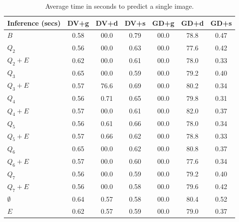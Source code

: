 \begin{table}[h]
  \centering
  \begin{tabular}{l|c|c|c|c|c|c}
    \hline
    \multicolumn{1}{c}{\bfseries Inference (secs)} & \multicolumn{1}{c}{\bfseries DV+g} &
    \multicolumn{1}{c}{\bfseries DV+d} & \multicolumn{1}{c}{\bfseries DV+s} &
    \multicolumn{1}{c}{\bfseries GD+g} & \multicolumn{1}{c}{\bfseries GD+d} &
    \multicolumn{1}{c}{\bfseries GD+s}\\
    \hline
    $B$         & 0.58 & 00.0 & 0.79 & 00.0 & 78.8 & 0.47 \\
    $Q_2$       & 0.56 & 00.0 & 0.63 & 00.0 & 77.6 & 0.42 \\
    $Q_2+E$     & 0.62 & 00.0 & 0.61 & 00.0 & 78.0 & 0.33 \\
    $Q_3$       & 0.65 & 00.0 & 0.59 & 00.0 & 79.2 & 0.40 \\
    $Q_3+E$     & 0.57 & 76.6 & 0.69 & 00.0 & 80.2 & 0.34 \\
    $Q_4$       & 0.56 & 0.71 & 0.65 & 00.0 & 79.8 & 0.31 \\
    $Q_4+E$     & 0.57 & 00.0 & 0.61 & 00.0 & 82.0 & 0.37 \\
    $Q_5$       & 0.56 & 0.61 & 0.66 & 00.0 & 78.0 & 0.34 \\
    $Q_5+E$     & 0.57 & 0.66 & 0.62 & 00.0 & 78.8 & 0.33 \\
    $Q_6$       & 0.65 & 00.0 & 0.62 & 00.0 & 80.8 & 0.37 \\
    $Q_6+E$     & 0.57 & 00.0 & 0.60 & 00.0 & 77.6 & 0.34 \\
    $Q_7$       & 0.56 & 00.0 & 0.59 & 00.0 & 79.2 & 0.40 \\
    $Q_7+E$     & 0.56 & 00.0 & 0.58 & 00.0 & 79.6 & 0.42 \\
    $\emptyset$ & 0.64 & 0.57 & 0.58 & 00.0 & 80.4 & 0.52 \\
    $E$         & 0.62 & 0.57 & 0.59 & 00.0 & 79.0 & 0.37 \\
  \end{tabular}
  \caption{Average time in seconds to predict a single image.\label{tab:time-inference}}
\end{table}
